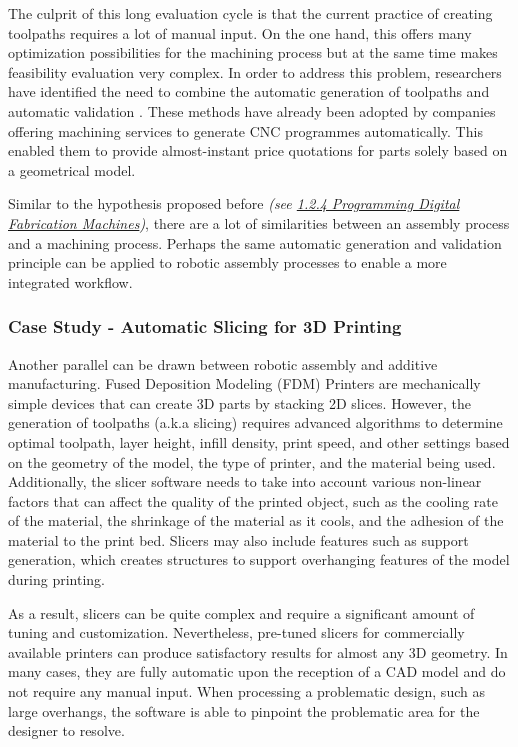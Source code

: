 The culprit of this long evaluation cycle is that the current practice of creating toolpaths requires a lot of manual input. On the one hand, this offers many optimization possibilities for the machining process but at the same time makes feasibility evaluation very complex. In order to address this problem, researchers have identified the need to combine the automatic generation of toolpaths and automatic validation \parencite{garciaProcessPlanningBased2011,sheenMachiningFeatureRecognition2006, joshiGraphbasedHeuristicsRecognition1988}. These methods have already been adopted by companies offering machining services to generate CNC programmes automatically. This enabled them to provide almost-instant price quotations for parts solely based on a geometrical model. 

Similar to the hypothesis proposed before \textit{(see \ul{1.2.4 Programming Digital Fabrication Machines})}, there are a lot of similarities between an assembly process and a machining process. Perhaps the same automatic generation and validation principle can be applied to robotic assembly processes to enable a more integrated workflow.


\subsubsection{Case Study - Automatic Slicing for 3D Printing}

Another parallel can be drawn between robotic assembly and additive manufacturing. Fused Deposition Modeling (FDM) Printers are mechanically simple devices that can create 3D parts by stacking 2D slices. However, the generation of toolpaths (a.k.a slicing) requires advanced algorithms to determine optimal toolpath, layer height, infill density, print speed, and other settings based on the geometry of the model, the type of printer, and the material being used. Additionally, the slicer software needs to take into account various non-linear factors that can affect the quality of the printed object, such as the cooling rate of the material, the shrinkage of the material as it cools, and the adhesion of the material to the print bed. Slicers may also include features such as support generation, which creates structures to support overhanging features of the model during printing. 

As a result, slicers can be quite complex and require a significant amount of tuning and customization. Nevertheless, pre-tuned slicers for commercially available printers can produce satisfactory results for almost any 3D geometry. In many cases, they are fully automatic upon the reception of a CAD model and do not require any manual input. When processing a problematic design, such as large overhangs, the software is able to pinpoint the problematic area for the designer to resolve. 

